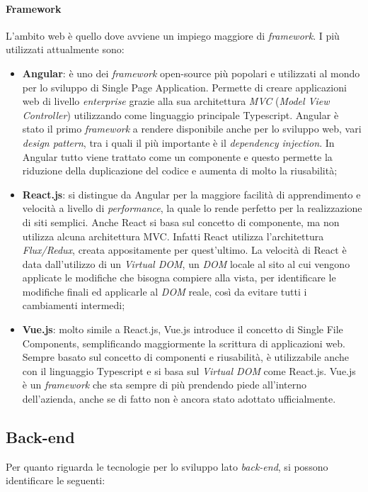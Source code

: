 \paragraph{Framework} L'ambito web è quello dove avviene un impiego maggiore di \textit{framework}. I più utilizzati attualmente sono:
\begin{itemize}
  \item \textbf{Angular}: è uno dei \textit{framework} open-source più popolari e utilizzati al mondo per lo sviluppo di \gls{Single Page Application}. Permette di creare applicazioni web di livello \textit{enterprise} grazie alla sua architettura \textit{MVC} (\textit{Model View Controller}) utilizzando come linguaggio principale Typescript. Angular è stato il primo \textit{framework} a rendere disponibile anche per lo sviluppo web, vari \textit{design pattern}, tra i quali il più importante è il \textit{dependency injection}. In Angular tutto viene trattato come un componente e questo permette la riduzione della duplicazione del codice e aumenta di molto la riusabilità;
  
  \item \textbf{React.js}: si distingue da Angular per la maggiore facilità di apprendimento e velocità a livello di \textit{performance}, la quale lo rende perfetto per la realizzazione di siti semplici. Anche React si basa sul concetto di componente, ma non utilizza alcuna architettura MVC. Infatti React utilizza l'architettura \textit{Flux/Redux}, creata appositamente per quest'ultimo. La velocità di React è data dall'utilizzo di un \textit{Virtual DOM}, un \textit{DOM} locale al sito al cui vengono applicate le modifiche che bisogna compiere alla vista, per identificare le modifiche finali ed applicarle al \textit{DOM} reale, così da evitare tutti i cambiamenti intermedi;
  
  \item \textbf{Vue.js}: molto simile a React.js, Vue.js introduce il concetto di \gls{Single File Components}, semplificando maggiormente la scrittura di applicazioni web. Sempre basato sul concetto di componenti e riusabilità, è utilizzabile anche con il linguaggio Typescript e si basa sul \textit{Virtual DOM} come React.js. Vue.js è un \textit{framework} che sta sempre di più prendendo piede all'interno dell'azienda, anche se di fatto non è ancora stato adottato ufficialmente.
\end{itemize}

\subsection{Back-end}
Per quanto riguarda le tecnologie per lo sviluppo lato \textit{back-end}, si possono identificare le seguenti:

